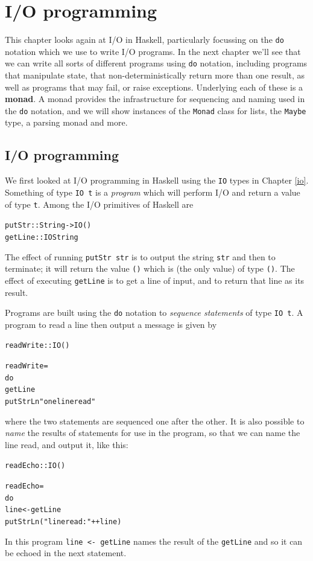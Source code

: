 
\chapter{I/O programming}
\chapstart
\label{io-programming}


This chapter looks again at I/O in Haskell, particularly focussing on the \texttt{do} notation which we use to write I/O programs.  In the next chapter we'll see that we can write all sorts of different programs using \texttt{do} notation, including programs that manipulate state, that non-deterministically return more than one result, as well as programs that may fail, or raise exceptions. 
Underlying each of these is a \textbf{monad}. A monad provides the infrastructure for sequencing and naming used in the \texttt{do} notation, and we will show instances of the \texttt{Monad} class for lists, the \texttt{Maybe} type, a parsing monad and more.




\section{I/O programming}

We first looked at I/O programming in Haskell using the \texttt{IO} types in Chapter \ref{io}. Something of type \texttt{IO t} is a \emph{program} which will perform I/O and return a value of type \texttt{t}. Among the I/O primitives of Haskell are
\begin{alltt}
putStr :: String -> IO ()
getLine :: IO String
\end{alltt}
The effect of running \texttt{putStr str} is to output the string \texttt{str} and then to terminate; it will return the value \texttt{()} which is (the only value) of type \texttt{()}.\minx{()} The effect of executing \texttt{getLine} is to get a line of input, and to return that line as its result.

Programs are built using the \texttt{do} notation to \emph{sequence statements} of type \texttt{IO t}. A program to read a line then output a message is given by
\begin{alltt}
readWrite :: IO ()

readWrite =
    do
      getLine
      putStrLn "one line read"
\end{alltt}
where the two statements are sequenced one after the other. It is also possible to \emph{name} the results of statements for use in the program, so that we can name the line read, and output it, like this:
\begin{alltt}
readEcho :: IO ()

readEcho =
    do
      line <-getLine
      putStrLn ("line read: " ++ line)
\end{alltt}
In this program \texttt{line <- getLine} names the result of the \texttt{getLine} and so it can be echoed in the next statement.

